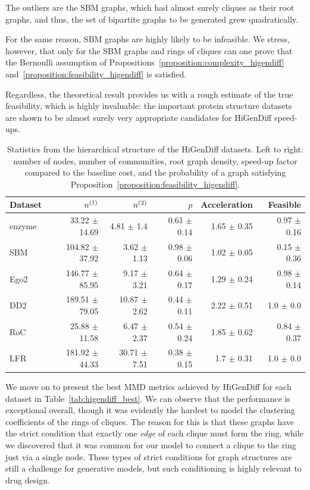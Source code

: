 The outliers are the SBM graphs, which had almost surely cliques as their root graphs, and thus, the set of bipartite graphs to be generated grew quadratically.

For the same reason, SBM graphs are highly likely to be infeasible. We stress, however, that only for the SBM graphs and rings of cliques can one prove that the Bernoulli assumption of Propositions~\ref{proposition:complexity_higendiff} and~\ref{proposition:feasibility_higendiff} is satisfied. 

Regardless, the theoretical result provides us with a rough estimate of the true feasibility, which is highly invaluable: the important protein structure datasets are shown to be almost surely very appropriate candidates for HiGenDiff speed-ups.

\begin{table}[!ht]
    \centering
    \caption[Statistics from the hierarchical structure of the HiGenDiff datasets.]{Statistics from the hierarchical structure of the HiGenDiff datasets. Left to right: number of nodes, number of communities, root graph density, speed-up factor compared to the baseline cost, and the probability of a graph satisfying Proposition~\ref{proposition:feasibility_higendiff}.}
    \label{tab:higendiff_datasets}
\begin{tabular}{lrrrrr}
\toprule
Dataset & $n^{\mathopen{}\left(1\right)}$ & $n^{\mathopen{}\left(2\right)}$ & $p$ & Acceleration & Feasible \\
\midrule
enzyme & 33.22 $\pm$ 14.69 & 4.81 $\pm$ 1.4 & 0.61 $\pm$ 0.14 & 1.65 $\pm$ 0.35 & 0.97 $\pm$ 0.16 \\
SBM & 104.82 $\pm$ 37.92 & 3.62 $\pm$ 1.13 & 0.98 $\pm$ 0.06 & 1.02 $\pm$ 0.05 & 0.15 $\pm$ 0.36 \\
Ego2 & 146.77 $\pm$ 85.95 & 9.17 $\pm$ 3.21 & 0.64 $\pm$ 0.17 & 1.29 $\pm$ 0.24 & 0.98 $\pm$ 0.14 \\
DD2 & 189.51 $\pm$ 79.05 & 10.87 $\pm$ 2.62 & 0.44 $\pm$ 0.11 & 2.22 $\pm$ 0.51 & 1.0 $\pm$ 0.0 \\
RoC & 25.88 $\pm$ 11.58 & 6.47 $\pm$ 2.37 & 0.54 $\pm$ 0.24 & 1.85 $\pm$ 0.62 & 0.84 $\pm$ 0.37 \\
LFR & 181.92 $\pm$ 44.33 & 30.71 $\pm$ 7.51 & 0.38 $\pm$ 0.15 & 1.7 $\pm$ 0.31 & 1.0 $\pm$ 0.0 \\
\bottomrule
\end{tabular}
\end{table}

We move on to present the best MMD metrics achieved by HiGenDiff for each dataset in Table~\ref{tab:higendiff_best}. We can observe that the performance is exceptional overall, though it was evidently the hardest to model the clustering coefficients of the rings of cliques. The reason for this is that these graphs have the strict condition that exactly one \emph{edge} of each clique must form the ring, while we discovered that it was common for our model to connect a clique to the ring just via a single node. These types of strict conditions for graph structures are still a challenge for generative models, but such conditioning is highly relevant to drug design.

